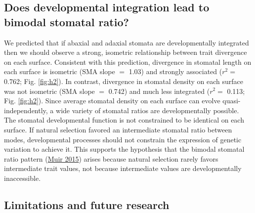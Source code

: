 \documentclass[
  12pt,
]{article}
\begin{document}
\hypertarget{does-developmental-integration-lead-to-bimodal-stomatal-ratio}{%
\subsection{Does developmental integration lead to bimodal stomatal ratio?}\label{does-developmental-integration-lead-to-bimodal-stomatal-ratio}}

We predicted that if abaxial and adaxial stomata are developmentally integrated then we should observe a strong, isometric relationship between trait divergence on each surface. Consistent with this prediction, divergence in stomatal length on each surface is isometric (SMA slope \(=\) 1.03) and strongly associated (\(r^2 =\) 0.762; Fig. \ref{fig:h2}). In contrast, divergence in stomatal density on each surface was not isometric (SMA slope \(=\) 0.742) and much less integrated (\(r^2 =\) 0.113; Fig. \ref{fig:h2}). Since average stomatal density on each surface can evolve quasi-independently, a wide variety of stomatal ratios are developmentally possible. The stomatal developmental function is not constrained to be identical on each surface. If natural selection favored an intermediate stomatal ratio between modes, developmental processes should not constrain the expression of genetic variation to achieve it. This supports the hypothesis that the bimodal stomatal ratio pattern (\protect\hyperlink{ref-muir_making_2015}{Muir 2015}) arises because natural selection rarely favors intermediate trait values, not because intermediate values are developmentally inaccessible.

\hypertarget{limitations-and-future-research}{%
\subsection{Limitations and future research}\label{limitations-and-future-research}}
\end{document}
